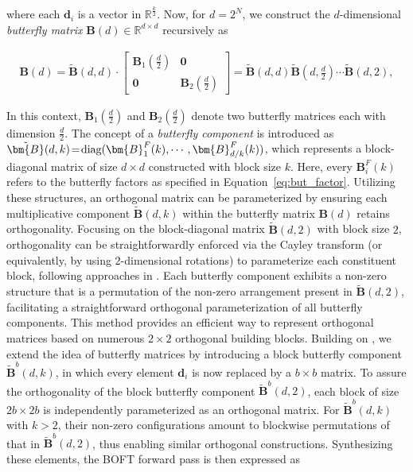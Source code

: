 where each $\bm{d}_i$ is a vector in $\mathbb{R}^{\frac{k}{2}}$. Now, for $d=2^N$, we construct the $d$-dimensional \emph{butterfly matrix} $\bm{B}(d)\in\mathbb{R}^{d\times d}$ recursively as

\begin{equation}
\begin{aligned}
    \!\!\bm{B}(d)=\tilde{\bm{B}}(d,d)\!\cdot\!\begin{bmatrix}
    \bm{B}_1(\frac{d}{2})\!\!\!\!\! & \bm{0} \\
    \bm{0}\!\!\!\!\! &\bm{B}_2(\frac{d}{2})
    \end{bmatrix}= \tilde{\bm{B}}(d,d)\tilde{\bm{B}}(d,\frac{d}{2})\cdots\tilde{\bm{B}}(d,2),
\end{aligned}
\end{equation}

In this context, $\bm{B}_1(\frac{d}{2})$ and $\bm{B}_2(\frac{d}{2})$ denote two butterfly matrices each with dimension $\frac{d}{2}$. The concept of a \emph{butterfly component} is introduced as $\thickmuskip=2mu \medmuskip=2mu \tilde{\bm{B}}(d,k)=\text{diag}(\bm{B}^F_1(k),\cdots,\bm{B}^F_{d/k}(k))$, which represents a block-diagonal matrix of size $d\times d$ constructed with block size $k$. Here, every $\bm{B}^F_i(k)$ refers to the butterfly factors as specified in Equation~\ref{eq:but_factor}. Utilizing these structures, an orthogonal matrix can be parameterized by ensuring each multiplicative component $\tilde{\bm{B}}(d,k)$ within the butterfly matrix $\bm{B}(d)$ retains orthogonality. Focusing on the block-diagonal matrix $\tilde{\bm{B}}(d,2)$ with block size $2$, orthogonality can be straightforwardly enforced via the Cayley transform (or equivalently, by using $2$-dimensional rotations) to parameterize each constituent block, following approaches in \cite{liu2021orthogonal,qiu2023controlling}. Each butterfly component exhibits a non-zero structure that is a permutation of the non-zero arrangement present in $\tilde{\bm{B}}(d,2)$, facilitating a straightforward orthogonal parameterization of all butterfly components. This method provides an efficient way to represent orthogonal matrices based on numerous $2\times 2$ orthogonal building blocks. Building on \cite{chen2022pixelated}, we extend the idea of butterfly matrices by introducing a block butterfly component $\tilde{\bm{B}}^b(d,k)$, in which every element $\bm{d}_i$ is now replaced by a $b\times b$ matrix. To assure the orthogonality of the block butterfly component $\tilde{\bm{B}}^b(d,2)$, each block of size $2b\times 2b$ is independently parameterized as an orthogonal matrix. For $\tilde{\bm{B}}^b(d,k)$ with $k>2$, their non-zero configurations amount to blockwise permutations of that in $\tilde{\bm{B}}^b(d,2)$, thus enabling similar orthogonal constructions. Synthesizing these elements, the BOFT forward pass is then expressed as

